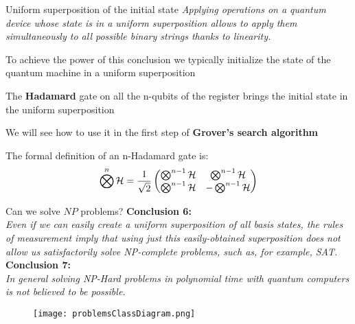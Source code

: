 		\begin{frame}{Uniform superposition of the initial state}
			\small
			\emph{Applying operations on a quantum device whose state is in a uniform superposition allows to apply them simultaneously to all possible binary strings thanks to linearity.}
			
			\vspace{0.3cm}
			
			To achieve the power of this conclusion we typically initialize the state of the quantum machine in a uniform superposition\\
			
			\vspace{0.2cm}
			
			The \textbf{Hadamard} gate on all the n-qubits of the register brings the initial state in the uniform superposition\\
			
			\vspace{0.2cm}
			
			We will see how to use it in the first step of \textbf{Grover's search algorithm}\\
			
			\vspace{0.2cm}
			
			The formal definition of an n-Hadamard gate is:
			\begin{equation*}
				\centering
				\bigotimes^{n}\mathcal{H} = \frac{1}{\sqrt{2}}
				\begin{pmatrix}
					\bigotimes^{n-1}\mathcal{H} & \bigotimes^{n-1}\mathcal{H} \\
					\bigotimes^{n-1}\mathcal{H} & -\bigotimes^{n-1}\mathcal{H}
				\end{pmatrix}
			\end{equation*}
		\end{frame}
	
		\begin{frame}{Can we solve $NP$ problems?}
			\small
			\textbf{Conclusion 6:\\}
			\emph{Even if we can easily create a uniform superposition of all basis states, the rules of measurement imply that using just this easily-obtained superposition does not allow us satisfactorily solve NP-complete problems, such as, for example, SAT.\\}
			\vspace{0.2cm}
			\textbf{Conclusion 7:\\}
			\emph{In general solving NP-Hard problems in polynomial time with quantum computers is not believed to be possible.}
			\vspace{0.3cm}
			\begin{figure}[h]
				\centering
				\texttt{[image: problemsClassDiagram.png]}
			\end{figure}
		\end{frame}
		
